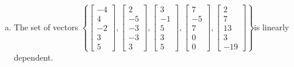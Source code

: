 \begin{exerciseAnswer}
\begin{enumerate}[(a)]
\item  The set of vectors \( \left\{ \left[\begin{array}{c}
-4 \\
4 \\
-2 \\
3 \\
5
\end{array}\right] , \left[\begin{array}{c}
2 \\
-5 \\
-3 \\
-3 \\
3
\end{array}\right] , \left[\begin{array}{c}
3 \\
-1 \\
5 \\
3 \\
5
\end{array}\right] , \left[\begin{array}{c}
7 \\
-5 \\
7 \\
0 \\
0
\end{array}\right] , \left[\begin{array}{c}
2 \\
7 \\
13 \\
3 \\
-19
\end{array}\right] \right\} \)is linearly dependent.
\end{enumerate}
    
\end{exerciseAnswer}
    

